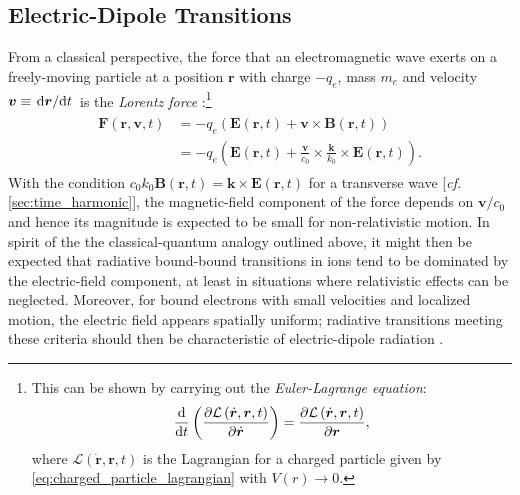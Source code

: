 \subsection{Electric-Dipole Transitions}\label{sec:allowed_transitions}
From a classical perspective, the force that an electromagnetic wave exerts on a freely-moving particle at a position $\mathbold{r}$ with charge $-q_e$, mass $m_e$ and velocity $\mathbold{v} \equiv \dv*{\mathbold{r}}{t}$ is the \emph{Lorentz force} \cite{Griffiths17,Jackson75,Rybicki86,Kahn02}:\footnote{This can be shown by carrying out the \emph{Euler-Lagrange equation}:
\begin{equation*} 
\dv{t} \left( \pdv{\mathcal{L} \left( \dot{\mathbold{r}}, \mathbold{r} , t \right)}{\dot{\mathbold{r}}} \right) = \pdv{\mathcal{L} \left( \dot{\mathbold{r}}, \mathbold{r} , t \right)}{\mathbold{r}} ,
 \end{equation*}
where $\mathcal{L} \left( \dot{\mathbold{r}}, \mathbold{r} , t \right)$ is the Lagrangian for a charged particle given by \cref{eq:charged_particle_lagrangian} with $V (r) \to 0$.} 
\begin{align}
\begin{split}\label{eq:Lorentz_force}
 \mathbold{F}(\mathbold{r},\mathbold{v},t) &= - q_e \left( \mathbold{E}(\mathbold{r},t) + \mathbold{v} \times \mathbold{B}(\mathbold{r},t) \right) \\
 &= - q_e \left( \mathbold{E}(\mathbold{r},t) + \frac{\mathbold{v}}{c_0} \times \frac{\mathbold{k}}{k_0} \times \mathbold{E}(\mathbold{r},t) \right) .
 \end{split}
 \end{align}
With the condition $c_0 k_0 \mathbold{B}(\mathbold{r},t) = \mathbold{k} \times \mathbold{E}(\mathbold{r},t)$ for a transverse wave [\emph{cf.\@} \cref{sec:time_harmonic}], the magnetic-field component of the force depends on $\mathbold{v} /c_0$ and hence its magnitude is expected to be small for non-relativistic motion. 
In spirit of the the classical-quantum analogy outlined above, it might then be expected that radiative bound-bound transitions in ions tend to be dominated by the electric-field component, at least in situations where relativistic effects can be neglected. 
Moreover, for bound electrons with small velocities and localized motion, the electric field appears spatially uniform; radiative transitions meeting these criteria should then be characteristic of electric-dipole radiation \cite{deBergevin09}. 
